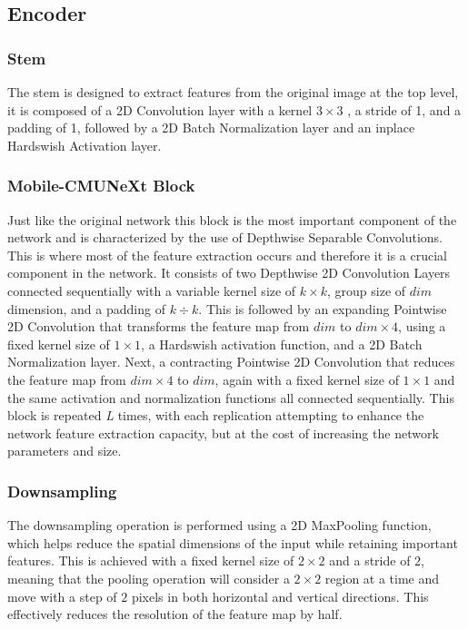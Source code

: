 \documentclass[lettersize,journal]{IEEEtran}
\begin{document}
\subsection{Encoder}

\subsubsection{Stem}
The stem is designed to extract features from the original image at the top level, it is composed of a 2D Convolution layer with a kernel $3 \times 3$ , a stride of 1, and a padding of 1, followed by a 2D Batch Normalization layer and an inplace Hardswish Activation layer.

\subsubsection{Mobile-CMUNeXt Block}
Just like the original network this block is the most important component of the network and is characterized by the use of Depthwise Separable Convolutions. This is where most of the feature extraction occurs and therefore it is a crucial component in the network. It consists of two Depthwise 2D Convolution Layers connected sequentially with a variable kernel size of $k \times k$, group size of $dim$ dimension, and a padding of $k \div k$. This is followed by an expanding Pointwise 2D Convolution that transforms the feature map from $dim$ to $dim \times 4$, using a fixed kernel size of $1 \times 1$, a Hardswish activation function, and a 2D Batch Normalization layer. Next, a contracting Pointwise 2D Convolution that reduces the feature map from $dim \times 4$ to $dim$, again with a fixed kernel size of $1 \times 1$ and the same activation and normalization functions all connected sequentially. This block is repeated \textit{L} times, with each replication attempting to enhance the network feature extraction capacity, but at the cost of increasing the network parameters and size. 

\subsubsection{Downsampling}
The downsampling operation is performed using a 2D MaxPooling function, which helps reduce the spatial dimensions of the input while retaining important features. This is achieved with a fixed kernel size of $2 \times 2$ and a stride of $2$, meaning that the pooling operation will consider a $2 \times 2$ region at a time and move with a step of $2$ pixels in both horizontal and vertical directions. This effectively reduces the resolution of the feature map by half.
\end{document}
